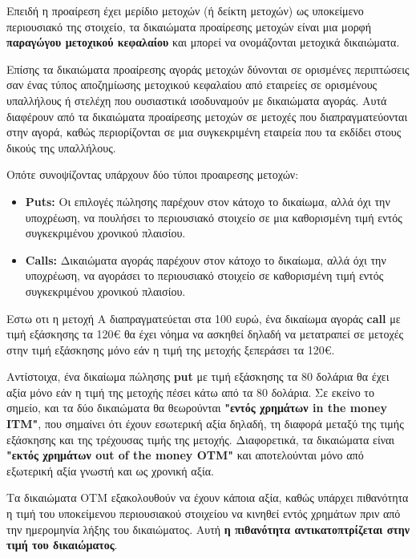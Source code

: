 Επειδή η προαίρεση έχει μερίδιο μετοχών (ή δείκτη μετοχών) ως υποκείμενο περιουσιακό της στοιχείο,
τα δικαιώματα προαίρεσης μετοχών είναι μια μορφή \textbf{παραγώγου μετοχικού κεφαλαίου} και 
μπορεί να ονομάζονται μετοχικά δικαιώματα.

Επίσης τα δικαιώματα προαίρεσης αγοράς μετοχών δύνονται σε ορισμένες περιπτώσεις σαν ένας τύπος
αποζημίωσης μετοχικού κεφαλαίου από εταιρείες σε ορισμένους υπαλλήλους ή στελέχη που ουσιαστικά 
ισοδυναμούν με δικαιώματα αγοράς. Αυτά διαφέρουν από τα δικαιώματα προαίρεσης μετοχών σε μετοχές που διαπραγματεύονται στην αγορά,
καθώς περιορίζονται σε μια συγκεκριμένη εταιρεία που τα εκδίδει στους δικούς της υπαλλήλους.

Οπότε συνοψίζοντας υπάρχουν δύο τύποι προαιρεσης μετοχών:
\begin{itemize}
    \item \textbf{Puts:} Οι επιλογές πώλησης παρέχουν στον κάτοχο το δικαίωμα, αλλά όχι την υποχρέωση, να πουλήσει το περιουσιακό στοιχείο σε μια καθορισμένη τιμή εντός συγκεκριμένου χρονικού πλαισίου.
    \item \textbf{Calls:} Δικαιώματα αγοράς παρέχουν στον κάτοχο το δικαίωμα, αλλά όχι την υποχρέωση, να αγοράσει το περιουσιακό στοιχείο σε καθορισμένη τιμή εντός συγκεκριμένου χρονικού πλαισίου.
\end{itemize}

\begin{tcolorbox}[colframe=gray!50!black, colback=gray!5, title=ΠαράδειγμαΠροαιρεσης Μετοχών]
    Εστω οτι η μετοχή Α διαπραγματεύεται στα 100 ευρώ, ένα δικαίωμα αγοράς \textbf{call} με τιμή εξάσκησης τα 120€ θα έχει νόημα να ασκηθεί δηλαδή να μετατραπεί σε μετοχές στην τιμή εξάσκησης
    μόνο εάν η τιμή της μετοχής ξεπεράσει τα 120€.

    Αντίστοιχα, ένα δικαίωμα πώλησης \textbf{put} με τιμή εξάσκησης τα 80 δολάρια θα έχει αξία μόνο εάν η τιμή της μετοχής πέσει κάτω από τα 80 δολάρια.
    Σε εκείνο το σημείο, και τα δύο δικαιώματα θα θεωρούνται \textbf{"εντός χρημάτων in the money ITM"}, που σημαίνει ότι έχουν εσωτερική αξία δηλαδή, τη διαφορά μεταξύ της τιμής εξάσκησης και της τρέχουσας τιμής της μετοχής.
    Διαφορετικά, τα δικαιώματα είναι \textbf{"εκτός χρημάτων out of the money OTM"} και αποτελούνται μόνο από εξωτερική αξία γνωστή και ως χρονική αξία.
    
    Τα δικαιώματα OTM εξακολουθούν να έχουν κάποια αξία, καθώς υπάρχει πιθανότητα η τιμή του υποκείμενου περιουσιακού στοιχείου να κινηθεί εντός χρημάτων πριν από την ημερομηνία λήξης του δικαιώματος. 
    Αυτή \textbf{η πιθανότητα αντικατοπτρίζεται στην τιμή του δικαιώματος}.
\end{tcolorbox}

